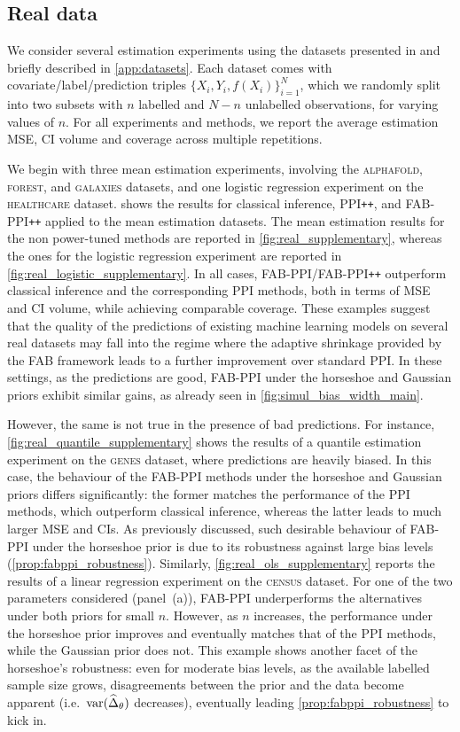 \subsection{Real data}\label{sec:real_data}
We consider several estimation experiments using the datasets presented in \citet{Angelopoulos2023} and briefly described in \cref{app:datasets}. Each dataset comes with covariate/label/prediction triples $\{X_i, Y_i, f(X_i)\}_{i=1}^N$, which we randomly split into two subsets with $n$ labelled and $N - n$ unlabelled observations, for varying values of $n$. For all experiments and methods, we report the average estimation MSE, CI volume and coverage across multiple repetitions.

We begin with three mean estimation experiments, involving the \textsc{alphafold}, \textsc{forest}, and \textsc{galaxies} datasets, and one logistic regression experiment on the \textsc{healthcare} dataset.  shows the results for classical inference, PPI\texttt{++}, and FAB-PPI\texttt{++} applied to the mean estimation datasets. The mean estimation results for the non power-tuned methods are reported in \cref{fig:real_supplementary}, whereas the ones for the logistic regression experiment are reported in \cref{fig:real_logistic_supplementary}. In all cases, FAB-PPI/FAB-PPI\texttt{++} outperform classical inference and the corresponding PPI methods, both in terms of MSE and CI volume, while achieving comparable coverage.
These examples suggest that the quality of the predictions of existing machine learning models on several real datasets may fall into the regime where the adaptive shrinkage provided by the FAB framework leads to a further improvement over standard PPI. In these settings, as the predictions are good, FAB-PPI under the horseshoe and Gaussian priors exhibit similar gains, as already seen in \cref{fig:simul_bias_width_main}.

However, the same is not true in the presence of bad predictions. For instance, \cref{fig:real_quantile_supplementary} shows the results of a quantile estimation experiment on the \textsc{genes} dataset, where predictions are heavily biased.
In this case, the behaviour of the FAB-PPI methods under the horseshoe and Gaussian priors differs significantly: the former matches the performance of the PPI methods, which outperform classical inference, whereas the latter leads to much larger MSE and CIs.
As previously discussed, such desirable behaviour of FAB-PPI under the horseshoe prior is due to its robustness against large bias levels (\cref{prop:fabppi_robustness}). 
Similarly, \cref{fig:real_ols_supplementary} reports the results of a linear regression experiment on the \textsc{census} dataset.
For one of the two parameters considered (panel~(a)), FAB-PPI underperforms the alternatives under both priors for small $n$.
However, as $n$ increases, the performance under the horseshoe prior improves and eventually matches that of the PPI methods, while the Gaussian prior does not.
This example shows another facet of the horseshoe's robustness: even for moderate bias levels, as the available labelled sample size grows, disagreements between the prior and the data become apparent (i.e.~$\mathrm{var}(\widehat{\Delta}_\theta)$ decreases), eventually leading \cref{prop:fabppi_robustness} to kick in.
